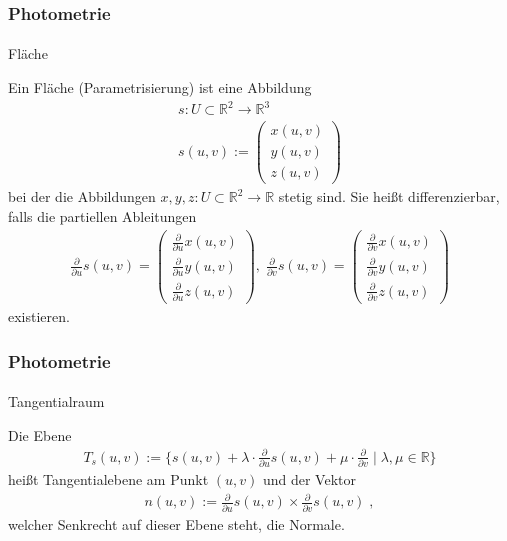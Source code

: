 \documentclass{beamer}
\begin{document}
\begin{frame}
    \frametitle{Photometrie}
\framesubtitle{}
\begin{block}{Fläche}

Ein Fläche (Parametrisierung) ist  eine  Abbildung
\begin{align*}
s: U \subset \mathbb{R}^2 \to \mathbb{R}^3 \\
s(u,v) := \begin{pmatrix} x(u,v) \\ y(u,v) \\ z(u,v) \end{pmatrix} 
\end{align*} 
bei der die Abbildungen $x, y, z : U \subset \mathbb{R}^2 \to \mathbb{R}$ stetig sind. Sie heißt differenzierbar, falls die partiellen Ableitungen
\begin{align*}
\frac{\partial}{\partial u} s(u,v) = \begin{pmatrix}  \frac{\partial}{\partial u} x(u,v) \\  \frac{\partial}{\partial u} y(u,v) \\  \frac{\partial}{\partial u} z(u,v) \end{pmatrix}, \;
\frac{\partial}{\partial v} s(u,v) =  \begin{pmatrix} \frac{\partial}{\partial v} x(u,v) \\ \frac{\partial}{\partial v} y(u,v) \\ \frac{\partial}{\partial v} z(u,v) \end{pmatrix}
\end{align*}
existieren. 
\end{block}
\end{frame}


\begin{frame}
    \frametitle{Photometrie}
\framesubtitle{}
\begin{block}{Tangentialraum}

Die Ebene 
\begin{align*}
T_s(u,v) :=  \{ s(u,v) + \lambda \cdot \frac{\partial}{\partial u} s(u,v) + \mu \cdot \frac{\partial}{\partial v} \; | \; \lambda, \mu \in \mathbb{R} \}
\end{align*}
heißt Tangentialebene am Punkt $(u,v)$ und  der Vektor 
\begin{align*}
n (u,v):= \frac{\partial}{\partial u} s(u,v) \times \frac{\partial}{\partial v} s(u,v) \; ,
\end{align*}
welcher Senkrecht auf dieser Ebene steht,  die Normale.
\end{block}
\end{frame}
\end{document}
